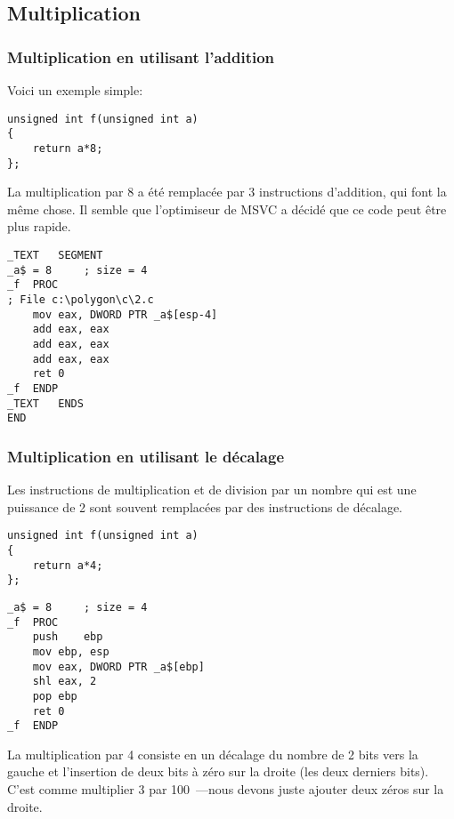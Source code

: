 ﻿\subsection{Multiplication}

\subsubsection{Multiplication en utilisant l'addition}

Voici un exemple simple:

\begin{lstlisting}[style=customc]
unsigned int f(unsigned int a)
{
	return a*8;
};
\end{lstlisting}

La multiplication par 8 a été remplacée par 3 instructions d'addition, qui font la
même chose.
Il semble que l'optimiseur de MSVC a décidé que ce code peut être plus rapide.

\begin{lstlisting}[caption=MSVC 2010 \Optimizing,style=customasmx86]
_TEXT	SEGMENT
_a$ = 8		; size = 4
_f	PROC
; File c:\polygon\c\2.c
	mov	eax, DWORD PTR _a$[esp-4]
	add	eax, eax
	add	eax, eax
	add	eax, eax
	ret	0
_f	ENDP
_TEXT	ENDS
END
\end{lstlisting}

\subsubsection{Multiplication en utilisant le décalage}
\label{subsec:mult_using_shifts}

Les instructions de multiplication et de division par un nombre qui est une puissance
de 2 sont souvent remplacées par des instructions de décalage.

\begin{lstlisting}[style=customc]
unsigned int f(unsigned int a)
{
	return a*4;
};
\end{lstlisting}

\begin{lstlisting}[caption=MSVC 2010 \NonOptimizing,style=customasmx86]
_a$ = 8		; size = 4
_f	PROC
	push	ebp
	mov	ebp, esp
	mov	eax, DWORD PTR _a$[ebp]
	shl	eax, 2
	pop	ebp
	ret	0
_f	ENDP
\end{lstlisting}


La multiplication par 4 consiste en un décalage du nombre de 2 bits vers la gauche
et l'insertion de deux bits à zéro sur la droite (les deux derniers bits).
C'est comme multiplier 3 par 100~---nous devons juste ajouter deux zéros sur la droite.

